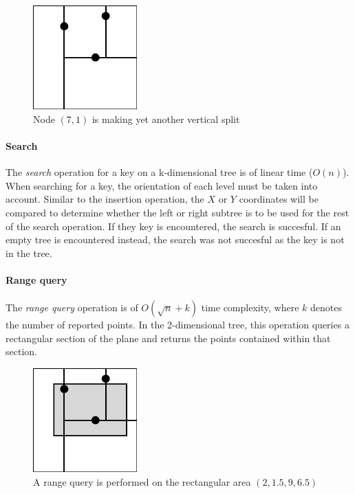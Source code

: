 \documentclass{article}
\begin{document}
{\begin{figure}[H]
  \centering
  \includegraphics[width=4cm]{2d_tree_2}
  \caption{Node \((7, 1)\) is making yet another vertical split}
\end{figure}

\paragraph{Search}
The {\em search} operation for a key on a k-dimensional tree is of linear time (\(O(n)\)).
When searching for a key, the orientation of each level must be taken into account.
Similar to the insertion operation, the \(X\) or \(Y\) coordinates will be compared to determine
whether the left or right subtree is to be used for the rest of the search operation.
If they key is encountered, the search is succesful. If an empty tree is encountered instead,
the search was not succesful as the key is not in the tree.

\paragraph{Range query}
The {\em range query} operation is of \(O(\sqrt{n} + k)\) time complexity, where \(k\) denotes the number of
reported points. In the 2-dimensional tree, this operation queries a rectangular section of the plane and
returns the points contained within that section.

\begin{figure}[H]
  \centering
  \includegraphics[width=4cm]{2d_tree_3}
  \caption{A range query is performed on the rectangular area \((2, 1.5, 9, 6.5)\)}
\end{figure}

}
\end{document}
